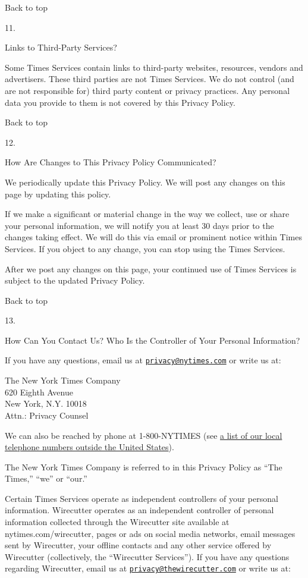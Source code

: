 Back to top

11.

Links to Third-Party Services?

Some Times Services contain links to third-party websites, resources,
vendors and advertisers. These third parties are not Times Services. We
do not control (and are not responsible for) third party content or
privacy practices. Any personal data you provide to them is not covered
by this Privacy Policy.

Back to top

12.

How Are Changes to This Privacy Policy Communicated?

We periodically update this Privacy Policy. We will post any changes on
this page by updating this policy.

If we make a significant or material change in the way we collect, use
or share your personal information, we will notify you at least 30 days
prior to the changes taking effect. We will do this via email or
prominent notice within Times Services. If you object to any change, you
can stop using the Times Services.

After we post any changes on this page, your continued use of Times
Services is subject to the updated Privacy Policy.

Back to top

13.

How Can You Contact Us? Who Is the Controller of Your Personal
Information?

If you have any questions, email us at
\href{mailto:privacy@nytimes.com}{\nolinkurl{privacy@nytimes.com}} or
write us at:

The New York Times Company\\
620 Eighth Avenue\\
New York, N.Y. 10018\\
Attn.: Privacy Counsel

We can also be reached by phone at 1-800-NYTIMES (see
\href{https://subscribe.inyt.com/footer?requestAction=displayContactIht}{a
list of our local telephone numbers outside the United States}).

The New York Times Company is referred to in this Privacy Policy as
``The Times,'' ``we'' or ``our.''

Certain Times Services operate as independent controllers of your
personal information. Wirecutter operates as an independent controller
of personal information collected through the Wirecutter site available
at nytimes.com/wirecutter, pages or ads on social media networks, email
messages sent by Wirecutter, your offline contacts and any other service
offered by Wirecutter (collectively, the ``Wirecutter Services''). If
you have any questions regarding Wirecutter, email us at
\href{mailto:privacy@thewirecutter.com}{\nolinkurl{privacy@thewirecutter.com}}
or write us at:

